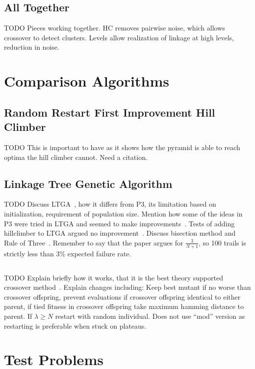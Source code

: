 \documentclass{sig-alternate}
\begin{document}
\subsection{All Together}
TODO Pieces working together.  HC removes pairwise noise, which allows crossover to detect
clusters.  Levels allow realization of linkage at high levels, reduction in noise.

\section{Comparison Algorithms}

\subsection{Random Restart First Improvement Hill Climber}
TODO This is important to have as it shows how the pyramid is able to reach optima
the hill climber cannot.  Need a citation.

\subsection{Linkage Tree Genetic Algorithm}
TODO Discuss LTGA~\cite{thierens:2013:ltgahiff}, how it differs from P3, its limitation based on
initialization, requirement of population size.  Mention how some
of the ideas in P3 were tried in LTGA and seemed to make improvements~\cite{goldman:2012:ltga}.
Tests of adding hillclimber to LTGA argued no improvement~\cite{bosman:2011:lsbbo}.
Discuss bisection method and Rule of Three~\cite{jovanovic:1997:ruleofthree}.
Remember to say that the paper argues for $\frac{3}{N+1}$, so 100 trails is strictly
less than $3\%$ expected failure rate.

\subsection{}
TODO Explain briefly how it works, that it is the best theory supported crossover method~\cite{doerr:2013:lambdalambda}.
Explain changes including: Keep best mutant if no worse than crossover offspring,
prevent evaluations if crossover offspring identical to either parent, if tied fitness
in crossover offspring take maximum hamming distance to parent.  If $\lambda \ge N$
restart with random individual.  Does not use ``mod'' version as restarting is preferable
when stuck on plateaus.

\section{Test Problems}
\end{document}
